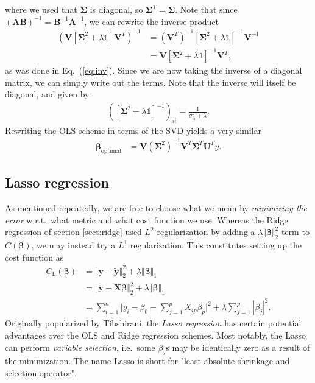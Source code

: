 \documentclass[a4paper, twocolumn]{article}
\newcommand{\eq} [1]{Eq.\ (\ref{eq:#1})}
\begin{document}
where we used that $\bm\Sigma$ is diagonal, so $\bm\Sigma^T =\bm\Sigma$. Note that since $(\mathbf{A}\mathbf{B})^{-1}=\mathbf{B}^{-1}\mathbf{A}^{-1}$, we can rewrite the inverse product 
\begin{align}
\left(\mathbf{V}\left[\bm\Sigma^2+\lambda\mathds{1}\right]\mathbf{V}^T\right)^{-1} &= \left(\mathbf{V}^T\right)^{-1} \left[\bm\Sigma^2+\lambda \mathds{1}\right]^{-1}\mathbf{V}^{-1} \nonumber \\
%
&= \mathbf{V}\left[\bm\Sigma^2+\lambda \mathds{1}\right]^{-1}\mathbf{V}^T, \nonumber
\end{align} 
as was done in \eq{inv}. Since we are now taking the inverse of a diagonal matrix, we can simply write out the terms. Note that the inverse will itself be diagonal, and given by
\begin{align}
\left(\left[\bm\Sigma^2+\lambda\mathds{1}\right]^{-1}\right)_{ii} = \frac{1}{\sigma_{ii}^2+\lambda}.
\end{align}
Rewriting the OLS scheme in terms of the SVD yields a very similar 
\begin{align}
\bm\beta_\text{optimal} &= \mathbf{V}\left(\bm\Sigma^2\right)^{-1}\mathbf{V}^T \bm\Sigma^T \mathbf{U}^Ty.
\end{align}

\subsection{Lasso regression \label{sect:lasso}}
As mentioned repeatedly, we are free to choose what we mean by \textit{minimizing the error} w.r.t.\ what metric and what cost function we use. Whereas the Ridge regression of section \ref{sect:ridge} used $L^2$ regularization by adding a $\lambda\Vert \bm\beta\Vert_2^2$ term to $C(\bm\beta)$, we may instead try a $L^1$ regularization. This constitutes setting up the cost function as
\begin{align}
C_\text{L}(\bm\beta) &= \Vert \mathbf{y} - \tilde{\mathbf{y}}\Vert_2^2 + \lambda \Vert \bm\beta \Vert_1 \nonumber \\
%
&= \Vert \mathbf{y} - \mathbf{X}\bm\beta\Vert_2^2 + \lambda \Vert \bm\beta \Vert_1 \nonumber \\
%
&= \sum_{i=1}^n\Big| y_i - \beta_0 - \sum_{j=1}^p X_{ip}\beta_p\Big|^2 + \lambda \sum_{j=1}^p |\beta_j|^2.
\end{align}
Originally popularized by Tibshirani\autocite{tibshirani1996regression}, the \textit{Lasso regression} has certain potential advantages over the OLS and Ridge regression schemes. Most notably, the Lasso can perform \textit{variable selection}, i.e.\ some $\beta_j$s may be identically zero as a result of the minimization. The name Lasso is short for "least absolute shrinkage and selection operator".
\end{document}
